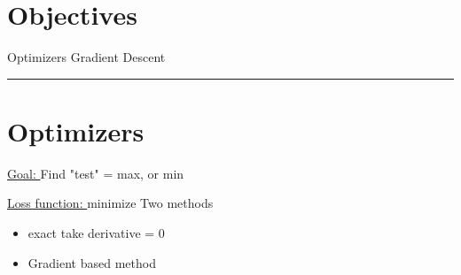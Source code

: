 


\section*{Objectives}
\begin{outline}
    \1 Optimizers
    \1 Gradient Descent
\end{outline}

\rule[0.0051in]{\textwidth}{0.00025in}

\section*{Optimizers}

\underline{Goal: } Find "test" = max, or min

\underline{Loss function: } minimize
Two methods
\begin{itemize}
    \item exact take derivative = 0
    \item  Gradient based method
\end{itemize}




